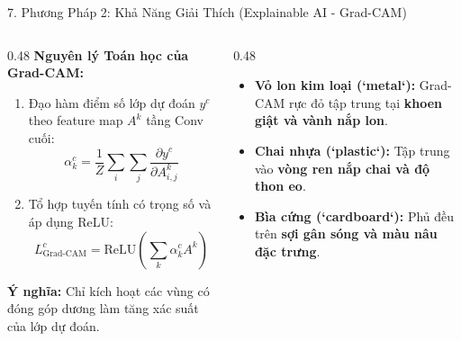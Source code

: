 \documentclass[aspectratio=169, 10pt]{beamer}
\begin{document}
\begin{frame}{7. Phương Pháp 2: Khả Năng Giải Thích (Explainable AI - Grad-CAM)}
\begin{columns}[T]
  \begin{column}{0.48\textwidth}
    \textbf{Nguyên lý Toán học của Grad-CAM:}
    \begin{enumerate}
      \item Đạo hàm điểm số lớp dự đoán $y^c$ theo feature map $A^k$ tầng Conv cuối:
      $$\alpha_k^c = \frac{1}{Z} \sum_{i} \sum_{j} \frac{\partial y^c}{\partial A_{i,j}^k}$$
      \item Tổ hợp tuyến tính có trọng số và áp dụng ReLU:
      $$L_{\text{Grad-CAM}}^c = \text{ReLU}\left( \sum_k \alpha_k^c A^k \right)$$
    \end{enumerate}
    \vspace{0.1cm}
    \alert{\textbf{Ý nghĩa:}} Chỉ kích hoạt các vùng có đóng góp dương làm tăng xác suất của lớp dự đoán.
  \end{column}

  \begin{column}{0.48\textwidth}
    \begin{tcolorbox}[colback=white, colframe=GreenRecycle, title=\textbf{Chứng minh CNN không học vẹt}]
      \begin{itemize}
        \item \textbf{Vỏ lon kim loại (`metal`):} Grad-CAM rực đỏ tập trung tại \textbf{khoen giật và vành nắp lon}.
        \item \textbf{Chai nhựa (`plastic`):} Tập trung vào \textbf{vòng ren nắp chai và độ thon eo}.
        \item \textbf{Bìa cứng (`cardboard`):} Phủ đều trên \textbf{sợi gân sóng và màu nâu đặc trưng}.
      \end{itemize}
    \end{tcolorbox}
  \end{column}
\end{columns}
\end{frame}
\end{document}
